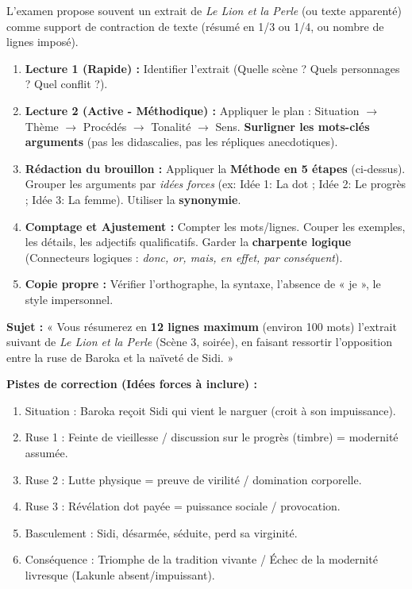 \documentclass[11pt]{article}
\newcommand{\cle}[1]{{\popxbold\color{popdark}#1}}
\begin{document}
\begin{methode}
L'examen propose souvent un extrait de \emph{Le Lion et la Perle} (ou texte apparenté) comme support de \cle{contraction de texte} (résumé en 1/3 ou 1/4, ou nombre de lignes imposé).
\begin{enumerate}
    \item \textbf{Lecture 1 (Rapide) :} Identifier l'extrait (Quelle scène ? Quels personnages ? Quel conflit ?).
    \item \textbf{Lecture 2 (Active - Méthodique) :} Appliquer le plan : Situation $\rightarrow$ Thème $\rightarrow$ Procédés $\rightarrow$ Tonalité $\rightarrow$ Sens. \textbf{Surligner les mots-clés arguments} (pas les didascalies, pas les répliques anecdotiques).
    \item \textbf{Rédaction du brouillon :} Appliquer la \textbf{Méthode en 5 étapes} (ci-dessus). Grouper les arguments par \emph{idées forces} (ex: Idée 1: La dot ; Idée 2: Le progrès ; Idée 3: La femme). Utiliser la \textbf{synonymie}.
    \item \textbf{Comptage et Ajustement :} Compter les mots/lignes. Couper les exemples, les détails, les adjectifs qualificatifs. Garder la \textbf{charpente logique} (Connecteurs logiques : \emph{donc, or, mais, en effet, par conséquent}).
    \item \textbf{Copie propre :} Vérifier l'orthographe, la syntaxe, l'absence de « je », le style impersonnel.
\end{enumerate}
\end{methode}

\begin{exemplebox}
\textbf{Sujet :} « Vous résumerez en \textbf{12 lignes maximum} (environ 100 mots) l'extrait suivant de \emph{Le Lion et la Perle} (Scène 3, soirée), en faisant ressortir l'opposition entre la ruse de Baroka et la naïveté de Sidi. »

\textbf{Pistes de correction (Idées forces à inclure) :}
\begin{enumerate}
    \item Situation : Baroka reçoit Sidi qui vient le narguer (croit à son impuissance).
    \item Ruse 1 : Feinte de vieillesse / discussion sur le progrès (timbre) = modernité assumée.
    \item Ruse 2 : Lutte physique = preuve de virilité / domination corporelle.
    \item Ruse 3 : Révélation dot payée = puissance sociale / provocation.
    \item Basculement : Sidi, désarmée, séduite, perd sa virginité.
    \item Conséquence : Triomphe de la tradition vivante / Échec de la modernité livresque (Lakunle absent/impuissant).
\end{enumerate}
\end{exemplebox}
\end{document}
